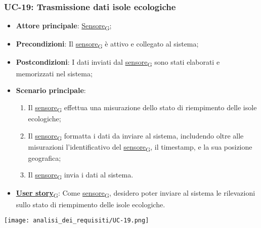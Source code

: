 \subsubsection{UC-19: Trasmissione dati isole ecologiche}
\begin{itemize}
	\item \textbf{Attore principale}: \href{https://7last.github.io/docs/rtb/documentazione-interna/glossario\#sensore}{Sensore\textsubscript{G}};
	\item \textbf{Precondizioni}: Il \href{https://7last.github.io/docs/rtb/documentazione-interna/glossario\#sensore}{sensore\textsubscript{G}} è attivo e collegato al sistema;
	\item \textbf{Postcondizioni}: I dati inviati dal \href{https://7last.github.io/docs/rtb/documentazione-interna/glossario\#sensore}{sensore\textsubscript{G}} sono stati elaborati e memorizzati nel sistema;
	\item \textbf{Scenario principale}:
	      \begin{enumerate}
		      \item Il \href{https://7last.github.io/docs/rtb/documentazione-interna/glossario\#sensore}{sensore\textsubscript{G}} effettua una misurazione dello stato di riempimento delle isole ecologiche;
		      \item Il \href{https://7last.github.io/docs/rtb/documentazione-interna/glossario\#sensore}{sensore\textsubscript{G}} formatta i dati da inviare al sistema, includendo oltre alle misurazioni l'identificativo del \href{https://7last.github.io/docs/rtb/documentazione-interna/glossario\#sensore}{sensore\textsubscript{G}},
		            il timestamp, e la sua posizione geografica;
		      \item Il \href{https://7last.github.io/docs/rtb/documentazione-interna/glossario\#sensore}{sensore\textsubscript{G}} invia i dati al sistema.
	      \end{enumerate}
	\item \href{https://7last.github.io/docs/rtb/documentazione-interna/glossario\#user-story}{\textbf{User story}\textsubscript{G}}: Come \href{https://7last.github.io/docs/rtb/documentazione-interna/glossario\#sensore}{sensore\textsubscript{G}}, desidero poter inviare al sistema le rilevazioni sullo stato di riempimento delle isole ecologiche.
\end{itemize}

\begin{center}
	\texttt{[image: analisi\_dei\_requisiti/UC-19.png]}
\end{center}

